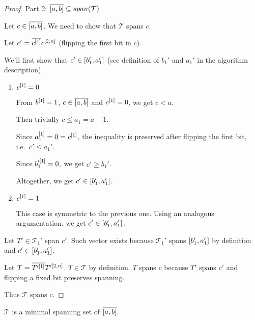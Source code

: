 \documentclass{article}
\begin{document}
\begin{proof}
Part 2: $\overline{[a, b]} \subseteq span(\mathcal{T})$

Let $c \in \overline{[a, b]}$.
We need to show that $\mathcal{T}$ spans $c$.

Let $c' = \overline{c^{[1]}} c^{[2, n]}$
(flipping the first bit in $c$).

We'll first show that $c' \in [b_1', a_1']$
(see definition of $b_1'$ and $a_1'$
in the algorithm description).

\begin{enumerate}
\item $c^{[1]} = 0$

From $b^{[1]} = 1$,
$c \in \overline{[a, b]}$
and $c^{[1]} = 0$,
we get $c < a$.

Then trivially $c \leq a_1 = a - 1$.

Since $a_1^{[1]} = 0 = c^{[1]}$,
the inequality is preserved after flipping the first bit,
i.e.~$c' \leq a_1'$.

Since $b_1'^{[1]} = 0$, we get $c' \geq b_1'$.

Altogether, we get $c' \in [b_1', a_1']$.
\item $c^{[1]} = 1$

This case is symmetric to the previous one.
Using an analogous argumentation,
we get $c' \in [b_1', a_1']$.
\end{enumerate}

Let $T' \in \mathcal{T}_1'$ span $c'$.
Such vector exists because
$\mathcal{T}_1'$ spans $[b_1', a_1']$
by definition
and $c' \in [b_1', a_1']$.

Let $T = \overline{T'^{[1]}} T'^{[2, n]}$.
$T \in \mathcal{T}$ by definition.
$T$ spans $c$ because $T'$ spans $c'$
and flipping a fixed bit preserves spanning.

Thus $\mathcal{T}$ spans $c$.
\end{proof}

\begin{theorem}
$\mathcal{T}$ is a minimal spanning set of $\overline{[a, b]}$.
\end{theorem}
\end{document}
